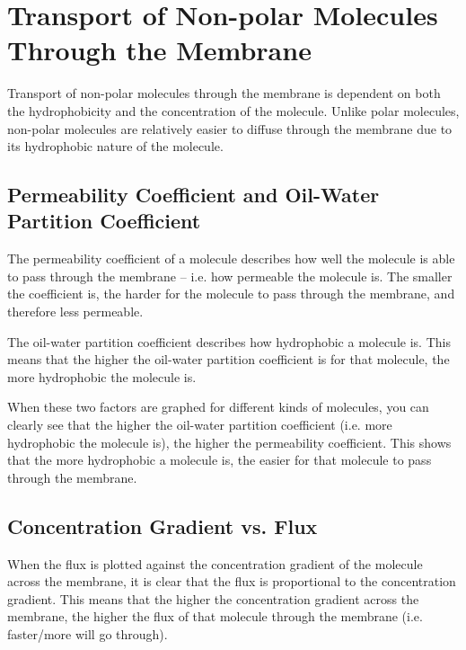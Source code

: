 \section{Transport of Non-polar Molecules Through the Membrane}

Transport of non-polar molecules through the membrane is dependent on both the hydrophobicity and the concentration of the molecule.
Unlike polar molecules, non-polar molecules are relatively easier to diffuse through the membrane due to its hydrophobic nature of the molecule.

\subsection{Permeability Coefficient and Oil-Water Partition Coefficient}

\begin{center}
\end{center}

The permeability coefficient of a molecule describes how well the molecule is able to pass through the membrane -- i.e. how permeable the molecule is.
The smaller the coefficient is, the harder for the molecule to pass through the membrane, and therefore less permeable.

The oil-water partition coefficient describes how hydrophobic a molecule is.
This means that the higher the oil-water partition coefficient is for that molecule, the more hydrophobic the molecule is.

When these two factors are graphed for different kinds of molecules, you can clearly see that the higher the oil-water partition coefficient (i.e. more hydrophobic the molecule is), the higher the permeability coefficient.
This shows that the more hydrophobic a molecule is, the easier for that molecule to pass through the membrane.

\subsection{Concentration Gradient vs. Flux}

\begin{center}
\end{center}

When the  flux  is plotted against the concentration gradient of the molecule across the membrane, it is clear that the flux is proportional to the concentration gradient.
This means that the higher the concentration gradient across the membrane, the higher the flux of that molecule through the membrane (i.e. faster/more will go through).

